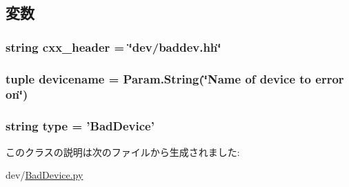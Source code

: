 \subsection{変数}
\hypertarget{classBadDevice_1_1BadDevice_a17da7064bc5c518791f0c891eff05fda}{
\subsubsection[{cxx\_\-header}]{\setlength{\rightskip}{0pt plus 5cm}string {\bf cxx\_\-header} = \char`\"{}dev/baddev.hh\char`\"{}}}
\label{classBadDevice_1_1BadDevice_a17da7064bc5c518791f0c891eff05fda}
\hypertarget{classBadDevice_1_1BadDevice_af7bdc8f0c2d972fc118fe96c89525de6}{
\subsubsection[{devicename}]{\setlength{\rightskip}{0pt plus 5cm}tuple {\bf devicename} = Param.String(\char`\"{}Name of device to error on\char`\"{})}}
\label{classBadDevice_1_1BadDevice_af7bdc8f0c2d972fc118fe96c89525de6}
\hypertarget{classBadDevice_1_1BadDevice_acce15679d830831b0bbe8ebc2a60b2ca}{
\subsubsection[{type}]{\setlength{\rightskip}{0pt plus 5cm}string {\bf type} = '{\bf BadDevice}'}}
\label{classBadDevice_1_1BadDevice_acce15679d830831b0bbe8ebc2a60b2ca}


このクラスの説明は次のファイルから生成されました:\begin{DoxyCompactItemize}
\item 
dev/\hyperlink{BadDevice_8py}{BadDevice.py}\end{DoxyCompactItemize}
